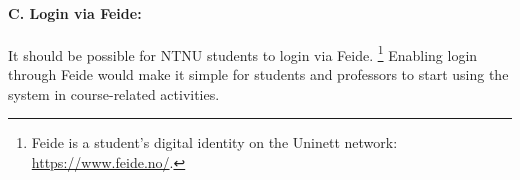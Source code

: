 \paragraph*{C. Login via Feide:} It should be possible for NTNU students to login via Feide. \footnote{Feide is a student's digital identity on the Uninett network: \url{https://www.feide.no/}.} Enabling login through Feide would make it simple for students and professors to start using the system in course-related activities.
